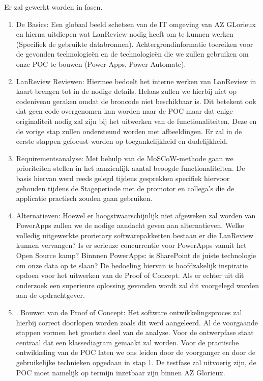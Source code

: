 \vspace{5mm}

Er zal gewerkt worden in fasen. 
\begin{enumerate}
    \item De Basics: Een globaal beeld schetsen van de IT omgeving van AZ GLorieux en hierna uitdiepen wat LanReview nodig heeft om te kunnen werken (Specifiek de gebruikte databronnen). Achtergrondinformatie toereiken voor de gevonden technologieën en de technologieën die we zullen gebruiken om onze POC te bouwen (Power Apps, Power Automate).
    \item LanReview Reviewen: Hiermee bedoelt het interne werken van LanReview in kaart brengen tot in de nodige details. Helaas zullen we hierbij niet op codeniveau geraken omdat de broncode niet beschikbaar is. Dit betekent ook dat geen code overgenomen kan worden naar de POC maar dat enige originaliteit nodig zal zijn bij het uitwerken van de functionaliteiten. Deze en de vorige stap zullen ondersteund worden met afbeeldingen. Er zal in de eerste stappen gefocust worden op toegankelijkheid en dudelijkheid.
    \item Requirementsanalyse: Met behulp van de MoSCoW-methode gaan we prioriteiten stellen in het aanzienlijk aantal beoogde functionaliteiten. De basis hiervan werd reeds gelegd tijdens gesprekken specifiek hiervoor gehouden tijdens de Stageperiode met de promotor en collega's die de applicatie practisch zouden gaan gebruiken.
    \item Alternatieven: Hoewel er hoogstwaarschijnlijk niet afgeweken zal worden van PowerApps zullen we de nodige aandacht geven aan alternatieven. Welke volledig uitgewerkte prorietary softwarepakketten bestaan er die LanReview kunnen vervangen? Is er serieuze concurrentie voor PowerApps vanuit het Open Source kamp? Binnnen PowerApps: is SharePoint de juiste technologie om onze data op te slaan? De bedoeling hiervan is hoofdzakelijk inspiratie opdoen voor het uitwerken van de Proof of Concept. Als er echter uit dit onderzoek een superieure oplossing gevonden wordt zal dit voorgelegd worden aan de opdrachtgever.
   \item. Bouwen van de Proof of Concept: Het software ontwikkelingsproces zal hierbij correct doorlopen worden zoals dit werd aangeleerd. Al de voorgaande stappen vormen het grootste deel van de analyse. Voor de ontwerpfase staat centraal dat een klassediagram gemaakt zal worden. Voor de practische ontwikkeling van de POC laten we ons leiden door de voorganger en door de gebruikelijke technieken opgedaan in stap 1. De testfase zal uitvoerig zijn, de POC moet namelijk op termijn inzetbaar zijn binnen AZ Glorieux.

\end{enumerate}

